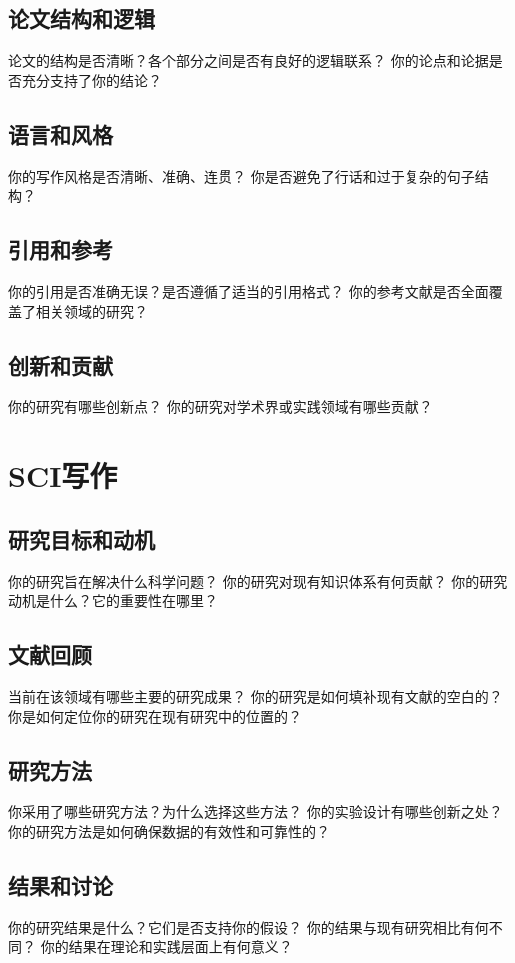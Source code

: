 \documentclass[12pt]{book}
\begin{document}
\subsection{论文结构和逻辑}
论文的结构是否清晰？各个部分之间是否有良好的逻辑联系？
你的论点和论据是否充分支持了你的结论？

\subsection{语言和风格}
你的写作风格是否清晰、准确、连贯？
你是否避免了行话和过于复杂的句子结构？

\subsection{引用和参考}
你的引用是否准确无误？是否遵循了适当的引用格式？
你的参考文献是否全面覆盖了相关领域的研究？

\subsection{创新和贡献}
你的研究有哪些创新点？
你的研究对学术界或实践领域有哪些贡献？

\section{SCI写作}
\subsection{研究目标和动机}
你的研究旨在解决什么科学问题？
你的研究对现有知识体系有何贡献？
你的研究动机是什么？它的重要性在哪里？

\subsection{文献回顾}
当前在该领域有哪些主要的研究成果？
你的研究是如何填补现有文献的空白的？
你是如何定位你的研究在现有研究中的位置的？

\subsection{研究方法}
你采用了哪些研究方法？为什么选择这些方法？
你的实验设计有哪些创新之处？
你的研究方法是如何确保数据的有效性和可靠性的？

\subsection{结果和讨论}
你的研究结果是什么？它们是否支持你的假设？
你的结果与现有研究相比有何不同？
你的结果在理论和实践层面上有何意义？
\end{document}
